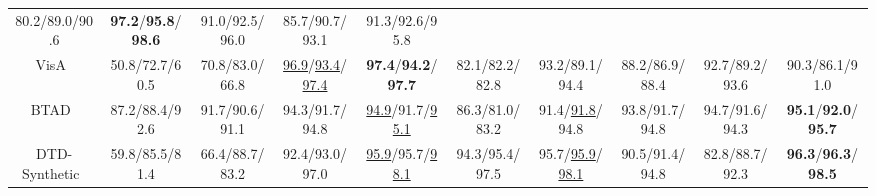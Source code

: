\begin{table}[]
{{\begin{tabular}{ccccccccc>{\columncolor{blue!8}}c}
  80.2/89.0/90.6 &
  \textbf{97.2}/\textbf{95.8}/\textbf{98.6} &
  91.0/92.5/96.0 &
  85.7/90.7/93.1 &
  91.3/92.6/95.8 \\
VisA~\cite{VisA} &
  50.8/72.7/60.5 &
  70.8/83.0/66.8 &
  \underline{96.9}/\underline{93.4}/\underline{97.4} &
  \textbf{97.4}/\textbf{94.2}/\textbf{97.7} &
  82.1/82.2/82.8 &
  93.2/89.1/94.4 &
  88.2/86.9/88.4 &
  92.7/89.2/93.6 &
  90.3/86.1/91.0 \\
BTAD~\cite{BTAD} &
  87.2/88.4/92.6 &
  91.7/90.6/91.1 &
  94.3/91.7/94.8 &
  \underline{94.9}/91.7/\underline{95.1} &
  86.3/81.0/83.2 &
  91.4/\underline{91.8}/94.8 &
  93.8/91.7/94.8 &
  94.7/91.6/94.3 &
  \textbf{95.1}/\textbf{92.0}/\textbf{95.7} \\
DTD-Synthetic~\cite{DTD} &
  59.8/85.5/81.4 &
  66.4/88.7/83.2 &
  92.4/93.0/97.0 &
  \underline{95.9}/95.7/\underline{98.1} &
  94.3/95.4/97.5 &
  95.7/\underline{95.9}/\underline{98.1} &
  90.5/91.4/94.8 &
  82.8/88.7/92.3 &
  \textbf{96.3}/\textbf{96.3}/\textbf{98.5} \\ \bottomrule[1.2pt]
\end{tabular}
}
}
\end{table}
